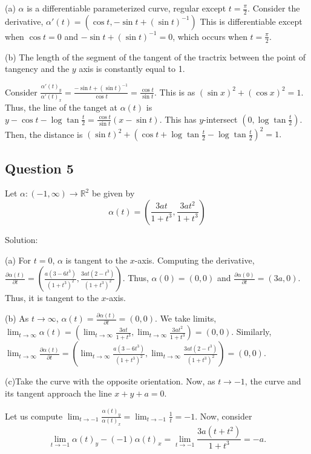 \documentclass[12pt]{article}
\begin{document}
(a) $\alpha$ is a differentiable parameterized curve, regular except $t = \frac \pi2$.
Consider the derivative, $\alpha'(t) = \left (\cos t, -\sin t + (\sin t)^{-1}\right )$
This is differentiable except when $\cos t = 0$ and $-\sin t + (\sin t)^{-1} = 0$, 
which occurs when $t = \frac \pi2$.

(b) The length of the segment of the tangent of the tractrix 
between the point of tangency and the $y$ axis is constantly equal to 1.

Consider $\frac {\alpha'(t)_y}{\alpha'(t)_x} = \frac{-\sin t + (\sin t)^{-1}}{\cos t} = \frac {\cos t}{\sin t}.$ This is as $(\sin x)^2 + (\cos x)^2 = 1.$
Thus, the line of the tanget at $\alpha(t)$ is $y - \cos t - \log \tan \frac t2 = \frac{\cos t}{\sin t}(x - \sin t).$
This has $y$-intersect $(0,\log \tan \frac t2).$ Then, the distance is $(\sin t)^2 + (\cos t + \log \tan \frac t2 - \log \tan \frac t2)^2 = 1.$



\subsection*{Question 5}

Let $\alpha : (-1, \infty) \to \mathbb{R}^2$ be given by
\begin{equation*}
     \alpha(t) = \left(\frac{3at}{1+t^3},\frac{3at^2}{1+t^3}\right)
\end{equation*}

Solution:

(a) For $t = 0$, $\alpha$ is tangent to the $x$-axis.
Computing the derivative, $\frac{\partial \alpha(t)}{\partial t} = \left(\frac{a(3 - 6t^3)}{(1+t^3)^2},\frac{3at(2-t^3)}{(1+t^3)^2}\right)$.
Thus, $\alpha(0) = (0,0)$ and $\frac{\partial \alpha(0)}{\partial t} = (3a, 0)$. Thus, it is tangent to the $x$-axis.

(b) As $t \to \infty$, $\alpha(t) = \frac{\partial \alpha(t)}{\partial t} = (0,0).$
We take limits, $\lim_{t\to \infty}\alpha(t) = \left(\lim_{t\to \infty}\frac{3at}{1+t^3},\lim_{t\to\infty}\frac{3at^2}{1+t^3}\right) = (0,0).$
Similarly, $\lim_{t \to \infty} \frac{\partial \alpha(t)}{\partial t} = 
\left(\lim_{t\to \infty}\frac{a(3 - 6t^3)}{(1+t^3)^2},\lim_{t\to \infty}\frac{3at(2-t^3)}{(1+t^3)^2}\right) = (0,0).$

(c)Take the curve with the opposite orientation. 
Now, as $t \to -1$, the curve
and its tangent approach the line $x + y + a = 0$.

Let us compute $\lim_{t\to -1}\frac {\alpha(t)_y}{\alpha(t)_x} = \lim_{t\to -1} \frac 1t = -1.$
Now, consider $$\lim_{t \to -1} \alpha(t)_y - (-1)\alpha(t)_x = \lim_{t\to -1} \frac{3a(t + t^2)}{1 + t^3} = -a.$$
\end{document}
